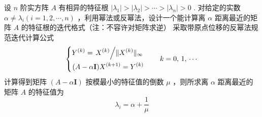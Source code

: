 \documentclass[11pt]{article}
\begin{document}
\begin{question}
    \questiontext
    {
        设 $n$ 阶实方阵 $A$ 有相异的特征根 $|\lambda_1| > |\lambda_2| > \cdots > |\lambda_n| > 0$ . 对给定的实数 $\alpha \neq \lambda_{i} (i = 1,2, \cdots, n)$ ，利用幂法或反幂法，设计一个能计算离 $\alpha$ 距离最近的矩阵 $A$ 的特征根的迭代格式（注：不容许对矩阵求逆）
    }
    \answer
    {
        采取带原点位移的反幂法规范迭代计算公式
        \begin{equation*}
            \left\{
            \begin{aligned}
                Y^{(k)} = \left.X^{(k)} \middle/ \Arrowvert X^{(k)} \Arrowvert_{\infty} \right. \\
                (A - \alpha \mathbf{I})X^{(k + 1)} = Y^{(k)}
            \end{aligned}
            \right. \qquad k = 0,\, 1,\, \cdots
        \end{equation*}
        计算得到矩阵 $(A - \alpha \mathbf{I})$ 按模最小的特征值的倒数 $\mu$ ，则所求离 $\alpha$ 距离最近的矩阵 $A$ 的特征值为
        \begin{equation*}
            \lambda_i = \alpha + \frac{1}{\mu}
        \end{equation*}
    }
\end{question}
\end{document}

